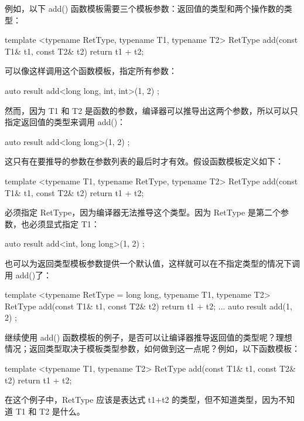 例如，以下 add() 函数模板需要三个模板参数：返回值的类型和两个操作数的类型：

\begin{cpp}
template <typename RetType, typename T1, typename T2>
RetType add(const T1& t1, const T2& t2) { return t1 + t2; }
\end{cpp}

可以像这样调用这个函数模板，指定所有参数：

\begin{cpp}
auto result { add<long long, int, int>(1, 2) };
\end{cpp}

然而，因为 T1 和 T2 是函数的参数，编译器可以推导出这两个参数，所以可以只指定返回值的类型来调用 add()：

\begin{cpp}
auto result { add<long long>(1, 2) };
\end{cpp}

这只有在要推导的参数在参数列表的最后时才有效。假设函数模板定义如下：

\begin{cpp}
template <typename T1, typename RetType, typename T2>
RetType add(const T1& t1, const T2& t2) { return t1 + t2; }
\end{cpp}

必须指定 RetType，因为编译器无法推导这个类型。因为 RetType 是第二个参数，也必须显式指定 T1：

\begin{cpp}
auto result { add<int, long long>(1, 2) };
\end{cpp}

也可以为返回类型模板参数提供一个默认值，这样就可以在不指定类型的情况下调用 add()了：

\begin{cpp}
template <typename RetType = long long, typename T1, typename T2>
RetType add(const T1& t1, const T2& t2) { return t1 + t2; }
...
auto result { add(1, 2) };
\end{cpp}


继续使用 add() 函数模板的例子，是否可以让编译器推导返回值的类型呢？理想情况；返回类型取决于模板类型参数，如何做到这一点呢？例如，以下函数模板：

\begin{cpp}
template <typename T1, typename T2>
RetType add(const T1& t1, const T2& t2) { return t1 + t2; }
\end{cpp}

在这个例子中，RetType 应该是表达式 t1+t2 的类型，但不知道类型，因为不知道 T1 和 T2 是什么。


